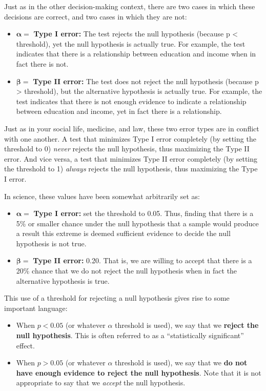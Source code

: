 \documentclass[
  letterpaper,
  DIV=11,
  numbers=noendperiod]{scrreprt}
\providecommand{\tightlist}{%
  \setlength{\itemsep}{0pt}\setlength{\parskip}{0pt}}\usepackage{longtable,booktabs,array}
\theoremstyle{definition}
\theoremstyle{remark}
\begin{document}
Just as in the other decision-making context, there are two cases in
which these decisions are correct, and two cases in which they are not:

\begin{itemize}
\tightlist
\item
  \(\boldsymbol{\alpha} =\) \textbf{Type I error:} The test rejects the
  null hypothesis (because p \textless{} threshold), yet the null
  hypothesis is actually true. For example, the test indicates that
  there is a relationship between education and income when in fact
  there is not.
\item
  \(\boldsymbol{\beta =}\) \textbf{Type II error:} The test does not
  reject the null hypothesis (because p \textgreater{} threshold), but
  the alternative hypothesis is actually true. For example, the test
  indicates that there is not enough evidence to indicate a relationship
  between education and income, yet in fact there is a relationship.
\end{itemize}

Just as in your social life, medicine, and law, these two error types
are in conflict with one another. A test that minimizes Type I error
completely (by setting the threshold to 0) \emph{never} rejects the null
hypothesis, thus maximizing the Type II error. And vice versa, a test
that minimizes Type II error completely (by setting the threshold to 1)
\emph{always} rejects the null hypothesis, thus maximizing the Type I
error.

In science, these values have been somewhat arbitrarily set as:

\begin{itemize}
\tightlist
\item
  \(\boldsymbol{\alpha} =\) \textbf{Type I error:} set the threshold to
  0.05. Thus, finding that there is a 5\% or smaller chance under the
  null hypothesis that a sample would produce a result this extreme is
  deemed sufficient evidence to decide the null hypothesis is not true.
\item
  \(\boldsymbol{\beta =}\) \textbf{Type II error:} 0.20. That is, we are
  willing to accept that there is a 20\% chance that we do not reject
  the null hypothesis when in fact the alternative hypothesis is true.
\end{itemize}

This use of a threshold for rejecting a null hypothesis gives rise to
some important language:

\begin{itemize}
\tightlist
\item
  When \(p < 0.05\) (or whatever \(\alpha\) threshold is used), we say
  that we \textbf{reject the null hypothesis}. This is often referred to
  as a ``statistically significant'' effect.
\item
  When \(p > 0.05\) (or whatever \(\alpha\) threshold is used), we say
  that we \textbf{do not have enough evidence to reject the null
  hypothesis}. Note that it is not appropriate to say that we
  \emph{accept} the null hypothesis.
\end{itemize}
\end{document}
